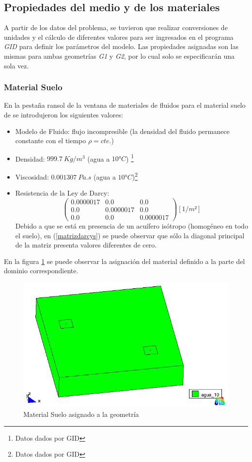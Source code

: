 \documentclass[10pt,a4paper,final]{article}
\begin{document}
\subsection{Propiedades del medio y de los materiales}
A partir de los datos del problema, se tuvieron que realizar conversiones de unidades y el cálculo de diferentes valores para ser ingresados en el programa \emph{GID} para definir los parámetros del modelo.
Las propiedades asignadas son las mismas para ambas geometrías \emph{G1} y \emph{G2}, por lo cual solo se especificarán una sola vez.
\subsubsection{Material Suelo}
En la pestaña ransol de la ventana de materiales de fluidos para el material suelo de  se introdujeron los siguientes valores:
\begin{itemize}
\item Modelo de Fluido: flujo incompresible (la densidad del fluido permanece constante con el tiempo $\rho = cte.$)
\item Densidad: $999.7~Kg/m^3$ (agua a $10° C$) \footnote{Datos dados por GID}
\item Viscosidad: $0.001307~Pa.s$ (agua a $10° C$)\footnote{Datos dados por GID}
\item Resistencia de la Ley de Darcy:
\begin{equation}
\begin{pmatrix}{}
0.0000017 & 0.0 & 0.0 \\ 
0.0 & 0.0000017 & 0.0 \\ 
0.0 & 0.0 & 0.0000017
\end{pmatrix} [1/m²]
\label{matrizdarcys}
\end{equation}
Debido a que se está en presencia de un acuífero isótropo (homogéneo en todo el suelo), en (\ref{matrizdarcys}) se puede observar que sólo la diagonal principal de la matriz presenta valores diferentes de cero.
\end{itemize}
En la figura \ref{100_perspectiva_material_agua} se puede observar la asignación del material definido a la parte del dominio correspondiente.
%
\begin{figure}[tbhp]
\centerline{\includegraphics[scale=0.5]{img/100m/100_perspectiva_material_agua}}
\caption{Material Suelo asignado a la geometría}
\label{100_perspectiva_material_agua}
\end{figure}
\end{document}
